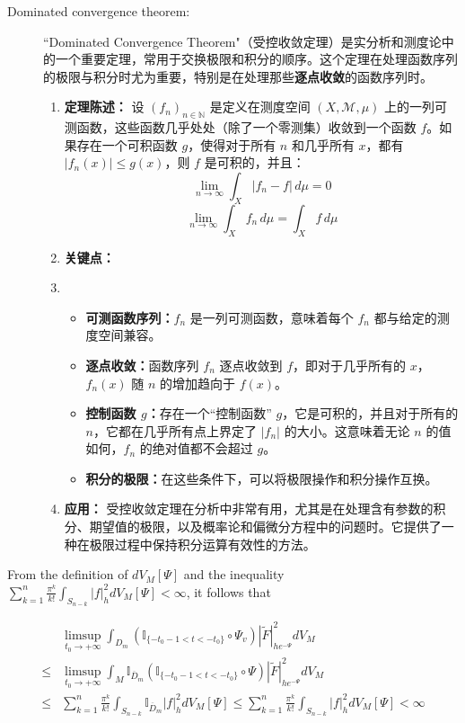 \begin{remark}
  \begin{description}
    \item[Dominated convergence theorem:] ``Dominated Convergence Theorem"（受控收敛定理）是实分析和测度论中的一个重要定理，常用于交换极限和积分的顺序。这个定理在处理函数序列的极限与积分时尤为重要，特别是在处理那些\textbf{逐点收敛}的函数序列时。
\begin{enumerate}
  \item \textbf{定理陈述：}
    设 \((f_n)_{n\in\mathbb{N}}\) 是定义在测度空间 \((X, \mathcal{M}, \mu)\) 上的一列可测函数，这些函数几乎处处（除了一个零测集）收敛到一个函数 \(f\)。如果存在一个可积函数 \(g\)，使得对于所有 \(n\) 和几乎所有 \(x\)，都有 \(|f_n(x)| \leq g(x)\)，则 \(f\) 是可积的，并且：
    \[ \lim_{n \to \infty} \int_X |f_n - f| \, d\mu = 0 \]
    \[ \lim_{n \to \infty} \int_X f_n \, d\mu = \int_X f \, d\mu \]
    \item \textbf{关键点：}
    \item \begin{itemize}
      \item \textbf{可测函数序列：}\(f_n\) 是一列可测函数，意味着每个 \(f_n\) 都与给定的测度空间兼容。
      \item \textbf{逐点收敛：}函数序列 \(f_n\) 逐点收敛到 \(f\)，即对于几乎所有的 \(x\)，\(f_n(x)\) 随 \(n\) 的增加趋向于 \(f(x)\)。
      \item \textbf{控制函数 \(g\)：}存在一个“控制函数” \(g\)，它是可积的，并且对于所有的 \(n\)，它都在几乎所有点上界定了 \(|f_n|\) 的大小。这意味着无论 \(n\) 的值如何，\(f_n\) 的绝对值都不会超过 \(g\)。
      \item  \textbf{积分的极限：}在这些条件下，可以将极限操作和积分操作互换。
    \end{itemize}
    \item  \textbf{应用：}
    受控收敛定理在分析中非常有用，尤其是在处理含有参数的积分、期望值的极限，以及概率论和偏微分方程中的问题时。它提供了一种在极限过程中保持积分运算有效性的方法。
\end{enumerate}
  \end{description}
\end{remark}
From the definition of $dV_{M}[\Psi]$ and the inequality
$\sum_{k=1}^{n}\frac{\pi^{k}}{k!}\int_{S_{n-k}}|f|^{2}_{h}dV_{M}[\Psi]<\infty$,
it follows that

\begin{equation}
\label{equ:smooth.vector3.6}
\begin{split}
&\limsup_{t_{0}\to+\infty}\int_{D_m}
(\mathbb{I}_{\{-t_{0}-1< t<-t_{0}\}}\circ\Psi_{v})|\tilde{F}|^{2}_{he^{-\Psi}}dV_{M}
\\\leq&
\limsup_{t_{0}\to+\infty}\int_{M}\mathbb{I}_{\overline{D}_{m}}
(\mathbb{I}_{\{-t_{0}-1<t<-t_{0}\}}\circ\Psi)|\tilde{F}|^{2}_{he^{-\Psi}}dV_{M}
\\\leq&\sum_{k=1}^{n}\frac{\pi^{k}}{k!}\int_{S_{n-k}}\mathbb{I}_{\overline{D}_{m}}|f|^{2}_{h}dV_{M}[\Psi]
\leq\sum_{k=1}^{n}\frac{\pi^{k}}{k!}\int_{S_{n-k}}|f|^{2}_{h}dV_{M}[\Psi]<\infty
\end{split}
\end{equation}

